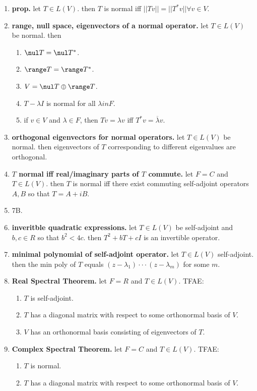 \begin{enumerate}
	\item \textbf{prop. } let $T \in L(V)$. then $T$ is normal iff $||Tv|| = ||T^*v|| \forall v \in V$. 
	\item \textbf{range, null space, eigenvectors of a normal operator. } let $T \in L(V)$ be normal. then
	\begin{enumerate}
		\item $\nul T = \nul T^*$. 
		\item $\range T = \range T^*$. 
		\item $V = \nul T \oplus \range T$. 
		\item $T-\lambda I$ is normal for all $\lambda in F$. 
		\item if $v \in V$ and $\lambda \in F$, then $Tv=\lambda v$ iff $T^*v = \overline{\lambda}v$. 
	\end{enumerate}
	\item \textbf{orthogonal eigenvectors for normal operators. } let $T \in L(V)$ be normal. then eigenvectors of $T$ corresponding to different eigenvalues are orthogonal. 
	\item \textbf{$T$ normal iff real/imaginary parts of $T$ commute. } let $F=C$ and $T \in L(V)$. then $T$ is normal iff there exist commuting self-adjoint operators $A,B$ so that $T=A+iB$. 
	\item 7B. 
	\item \textbf{inveritble quadratic expressions. } let $T \in L(V)$ be self-adjoint and $b,c \in R$ so that $b^2 < 4c$. then $T^2 + bT + cI$ is an invertible operator. 
	\item \textbf{minimal polynomial of self-adjoint operator. } let $T \in L(V)$ self-adjoint. then the min poly of $T$ equals $(z-\lambda_1) \cdot \cdot \cdot (z-\lambda_m)$ for some $m$. 
	\item \textbf{Real Spectral Theorem. } let $F=R$ and $T \in L(V)$. TFAE: 
	\begin{enumerate}
		\item $T$ is self-adjoint. 
		\item $T$ has a diagonal matrix with respect to some orthonormal basis of $V$. 
		\item $V$ has an orthonormal basis consisting of eigenvectors of $T$. 
	\end{enumerate}
	\item \textbf{Complex Spectral Theorem. } let $F=C$ and $T \in L(V)$. TFAE: 
	\begin{enumerate}
		\item $T$ is normal. 
		\item $T$ has a diagonal matrix with respect to some orthonormal basis of $V$. 

\end{enumerate}
\end{enumerate}
